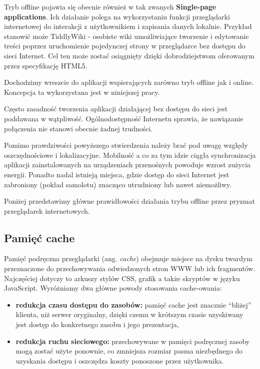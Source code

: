 Tryb offline pojawia się obecnie również w tak zwanych \textbf{Single-page applications}. Ich działanie polega na wykorzystaniu funkcji przeglądarki internetowej do interakcji z użytkownikiem i zapisania danych lokalnie. Przykład stanowić może TiddlyWiki - osobiste wiki umożliwiające tworzenie i edytowanie treści poprzez uruchomienie pojedynczej strony w przeglądarce bez dostępu do sieci Internet. Cel ten może zostać osiągnięty dzięki dobrodziejstwom oferowanym przez specyfikację HTML5.

Dochodzimy wreszcie do aplikacji wspierających zarówno tryb offline jak i online. Koncepcja ta wykorzystana jest w niniejszej pracy.

Często zasadność tworzenia aplikacji działającej bez dostępu do sieci jest poddawana w wątpliwość. Ogólnodostępność Internetu sprawia, że nawiązanie połączenia nie stanowi obecnie żadnej trudności.

Pomimo prawdziwości powyższego stwierdzenia należy brać pod uwagę względy oszczędnościowe i lokalizacyjne. Mobilność a co za tym idzie ciągła synchronizacja aplikacji zainstalowanych na urządzeniach przenośnych powoduje wzrost zużycia energii. Ponadto nadal istnieją miejsca, gdzie dostęp do sieci Internet jest zabroniony (pokład samolotu) znacząco utrudniony lub nawet niemożliwy.

Poniżej przedstawimy główne prawidłowości działania trybu offline przez pryzmat przeglądarek internetowych.

\subsection{Pamięć cache}
\label{sec:pamiecCache}

Pamięć podręczna przeglądarki (ang. \emph{cache}) obejmuje miejsce na dysku twardym przeznaczone do przechowywania odwiedzonych stron WWW lub ich fragmentów. Najczęściej dotyczy to arkuszy stylów CSS, grafik a także skryptów w języku JavaScript. Wyróżniamy dwa główne powody stosowania cache-owania:

\begin{itemize}
\item \textbf{redukcja czasu dostępu do zasobów:} pamięć cache jest znacznie “bliżej” klienta, niż serwer oryginalny, dzięki czemu w krótszym czasie uzyskiwany jest dostęp do konkretnego zasobu i jego prezentacja,
\item \textbf{redukcja ruchu sieciowego:} przechowywane w pamięci podręcznej zasoby mogą zostać użyte ponownie, co zmniejsza rozmiar pasma niezbędnego do uzyskania dostępu i oszczędza koszty ponoszone przez użytkownika.
\end{itemize}


